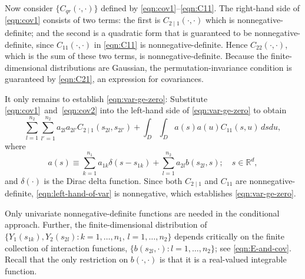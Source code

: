 \documentclass[lineno]{biometrika}
\newcommand{\svec} {s}
\newcommand{\s}{s}
\renewcommand{\u}{u}
\renewcommand{\d}{d}
\newcommand{\RR}{\mathbb{R}}
\begin{document}
Now consider $\{C_{qr}(\cdot,\cdot)\}$ defined by \eqref{eqn:cov1}--\eqref{eqn:C11}. The right-hand side of \eqref{eqn:cov1} consists of two terms: the first is $C_{2\mid 1}(\cdot,\cdot)$ which is nonnegative-definite; and the second is a quadratic form that is guaranteed to be nonnegative-definite, since $C_{11}(\cdot,\cdot)$ in \eqref{eqn:C11} is nonnegative-definite. Hence $C_{22}(\cdot,\cdot)$, which is the sum of these two terms, is nonnegative-definite. Because the finite-dimensional distributions are Gaussian, the permutation-invariance condition is guaranteed by \eqref{eqn:C21}, an expression for covariances.

It only remains to establish \eqref{eqn:var-ge-zero}: Substitute \eqref{eqn:cov1}~and~\eqref{eqn:cov2} into the left-hand side of \eqref{eqn:var-ge-zero} to obtain 
\begin{equation}\label{eqn:left-hand-of-var}
\sum_{l=1}^{n_2}\sum_{l'=1}^{n_2}a_{2l}a_{2l'}C_{2\mid 1}(\s_{2l},\s_{2l'})+\int_D \int_D{a(\s)a(\u)C_{11}(\s,\u)\,\d\s\d\u},
\end{equation}
where
\begin{equation*}
a(\s)\equiv \sum_{k=1}^{n_1}a_{1k}\delta(\s-\s_{1k})+\sum_{l=1}^{n_2}a_{2l}b(\s_{2l},\s);\quad \s\in \RR^d,
\end{equation*}
and $\delta(\cdot)$ is the Dirac delta function. Since both $C_{2\mid 1}$ and $C_{11}$ are nonnegative-definite, \eqref{eqn:left-hand-of-var} is nonnegative, which establishes \eqref{eqn:var-ge-zero}.

Only univariate nonnegative-definite functions are needed in the conditional approach. Further, the finite-dimensional distribution of $\{Y_1(\svec_{1k}),Y_2(\svec_{2l}):k=1,\dots,n_1,\, l = 1,\dots,n_2\}$ depends critically on the finite collection of interaction functions, $\{b(\s_{2l},\cdot):l=1,\ldots,n_2\}$; see \eqref{eqn:E-and-cov}. Recall that the only restriction on $b(\cdot,\cdot)$ is that it is a real-valued integrable function.
\end{document}
